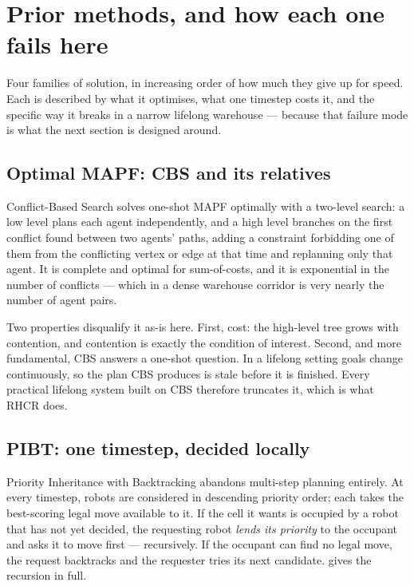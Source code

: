 \section{Prior methods, and how each one fails here}
\label{sec:related}

\begin{lede}
Four families of solution, in increasing order of how much they give up for
speed. Each is described by what it optimises, what one timestep costs it, and
the specific way it breaks in a narrow lifelong warehouse --- because that
failure mode is what the next section is designed around.
\end{lede}

\subsection{Optimal MAPF: CBS and its relatives}
\label{sec:related-cbs}

Conflict-Based Search \citep{sharon2015cbs} solves one-shot MAPF optimally with
a two-level search: a low level plans each agent independently, and a high
level branches on the first conflict found between two agents' paths, adding a
constraint forbidding one of them from the conflicting vertex or edge at that
time and replanning only that agent. It is complete and optimal for sum-of-costs,
and it is exponential in the number of conflicts --- which in a dense warehouse
corridor is very nearly the number of agent pairs.

Two properties disqualify it as-is here. First, cost: the high-level tree grows
with contention, and contention is exactly the condition of interest. Second,
and more fundamental, CBS answers a one-shot question. In a lifelong setting
goals change continuously, so the plan CBS produces is stale before it is
finished. Every practical lifelong system built on CBS therefore truncates it,
which is what RHCR does.

\subsection{PIBT: one timestep, decided locally}
\label{sec:related-pibt}

Priority Inheritance with Backtracking \citep{okumura2019pibt} abandons
multi-step planning entirely. At every timestep, robots are considered in
descending priority order; each takes the best-scoring legal move available to
it. If the cell it wants is occupied by a robot that has not yet decided, the
requesting robot \emph{lends its priority} to the occupant and asks it to move
first --- recursively. If the occupant can find no legal move, the request
backtracks and the requester tries its next candidate.  gives
the recursion in full.

